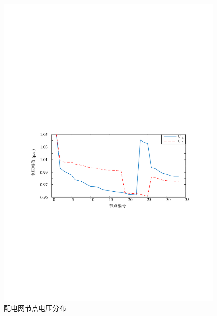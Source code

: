\begin{figure}[H]
\centering
\includegraphics[scale=0.76]{figures/Chap4-15-Hub-Dispatch-Exe-Bus-Vol.pdf}
\caption{配电网节点电压分布}
\label{Fig:Hub-Dispatch-Exe-Bus-Vol}
\end{figure}

